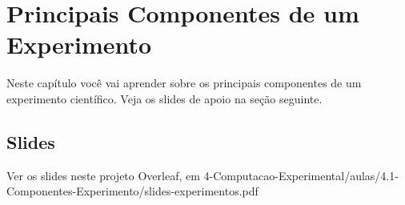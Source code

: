 \chapter{Principais Componentes de um Experimento}

Neste capítulo você vai aprender sobre os principais componentes de um experimento científico. Veja os slides de apoio na seção seguinte.

\section{Slides}
Ver os slides neste projeto Overleaf, em
4-Computacao-Experimental/aulas/4.1-Componentes-Experimento/slides-experimentos.pdf
%
